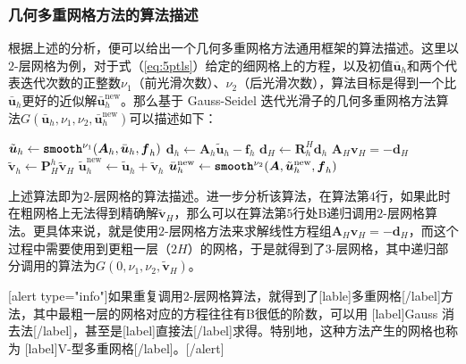 \documentclass[12pt, UTF8, nofonts]{ctexart}
\begin{document}
\subsubsection*{几何多重网格方法的算法描述}

根据上述的分析，便可以给出一个几何多重网格方法通用框架的算法描述。这里以$2$-层网格为例，对于式（\ref{eq:5ptls}）给定的细网格上的方程，以及初值$\bar{\boldsymbol{u}}_h$和两个代表迭代次数的正整数$\nu_1$（前光滑次数）、$\nu_2$（后光滑次数），算法目标是得到一个比$\bar{\boldsymbol{u}}_h$更好的近似解$\bar{\boldsymbol{u}}_h^{\mathrm{new}}$。那么基于 Gauss-Seidel 迭代光滑子的几何多重网格方法算法$G(\bar{\boldsymbol{u}}_h,\nu_1,\nu_2,\bar{\boldsymbol{u}}_h^{\mathrm{new}})$可以描述如下：

\begin{algorithm}[H]
  $\tilde{\boldsymbol{u}}_h \gets \textbf{\texttt{smooth}}^{\nu_1}(\boldsymbol{A}_h,\bar{\boldsymbol{u}}_h,\boldsymbol{f}_h)$ \;
  $\boldsymbol{d}_h \gets \boldsymbol{A}_h\tilde{\boldsymbol{u}}_h - \boldsymbol{f}_h$
  $\boldsymbol{d}_H \gets \boldsymbol{R}_{h}^{H}\boldsymbol{d}_h$
  $\boldsymbol{A}_H\boldsymbol{v}_H = -\boldsymbol{d}_H$
  $\tilde{\boldsymbol{v}}_h \gets \boldsymbol{P}_{H}^{h}\tilde{\boldsymbol{v}}_H$
  $\tilde{\boldsymbol{u}}_h^{\mathrm{new}} \gets \tilde{\boldsymbol{u}}_h + \tilde{\boldsymbol{v}}_h$
  $\bar{\boldsymbol{u}}_h^{\mathrm{new}} \gets \textbf{\texttt{smooth}}^{\nu_2}(\boldsymbol{A},\tilde{\boldsymbol{u}}_h^{\mathrm{new}},\boldsymbol{f}_h)$ \;
\end{algorithm}

上述算法即为$2$-层网格的算法描述。进一步分析该算法，在算法第$4$行，如果此时在粗网格上无法得到精确解$\tilde{\boldsymbol{v}}_H$，那么可以在算法第$5$行处B递归调用$2$-层网格算法。更具体来说，就是使用$2$-层网格方法来求解线性方程组$\boldsymbol{A}_H\boldsymbol{v}_H=-\boldsymbol{d}_H$，而这个过程中需要使用到更粗一层（$2H$）的网格，于是就得到了$3$-层网格，其中递归部分调用的算法为$G(0,\nu_1,\nu_2,\tilde{\boldsymbol{v}}_H)$。

[alert type="info"]如果重复调用$2$-层网格算法，就得到了[lable]多重网格[/label]方法，其中最粗一层的网格对应的方程往往有B很低的阶数，可以用 [label]Gauss 消去法[/label]，甚至是[label]直接法[/label]求得。特别地，这种方法产生的网格也称为 [label]V-型多重网格[/label]。[/alert]
\end{document}

